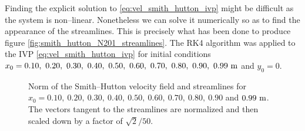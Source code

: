 Finding the explicit solution to \eqref{eq:vel_smith_hutton_ivp} might be
difficult as the system is non--linear. Nonetheless we can solve it numerically
so as to find the appearance of the streamlines. This is precisely what has been
done to produce figure \eqref{fig:smith_hutton_N201_streamlines}. The RK4
algorithm was applied to the IVP \eqref{eq:vel_smith_hutton_ivp} for initial
conditions $x_0 = 0.10, \ 0.20, \ 0.30, \ 0.40, \ 0.50, \ 0.60, \ 0.70, \ 0.80,
\ 0.90, \ 0.99 \ \meter$ and $y_0 = 0$.

\begin{figure}[ht]
	\centering
	
	\captionsetup{width=0.75\textwidth}
	\caption{Norm of the Smith--Hutton velocity field and streamlines for $x_0 =
	0.10, \ 0.20, \ 0.30, \ 0.40, \ 0.50, \ 0.60, \ 0.70, \ 0.80, \ 0.90$ and
	$0.99 \ \meter$. The vectors tangent to the streamlines are normalized and
	then scaled down by a factor of $\sqrt{2}/50$.}
	\label{fig:smith_hutton_N201_streamlines}
\end{figure}